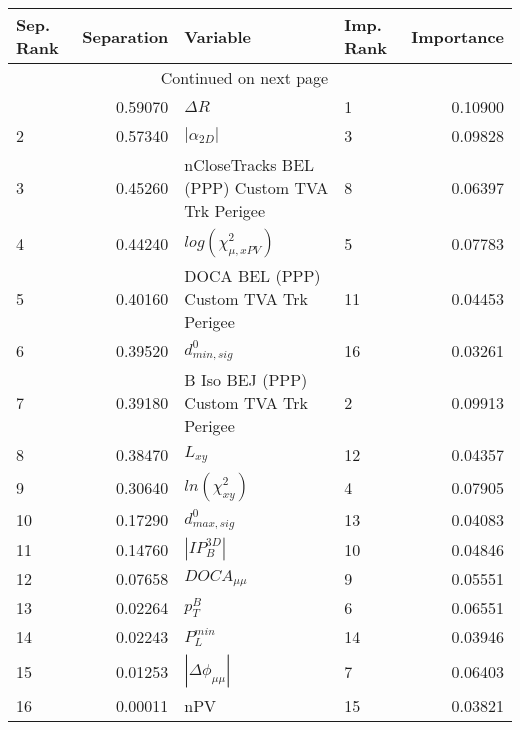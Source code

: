 \usepackage{lscape}

\begin{landscape}
\begin{longtable}{lrllr}
\toprule
Sep. Rank &  Separation &                                       Variable & Imp. Rank &  Importance \\
\midrule
\endhead
\midrule
\multicolumn{3}{r}{{Continued on next page}} \\
\midrule
\endfoot

\bottomrule
\endlastfoot
        1 &     0.59070 &                                     $\Delta R$ &         1 &     0.10900 \\
        2 &     0.57340 &                                $|\alpha_{2D}|$ &         3 &     0.09828 \\
        3 &     0.45260 &  nCloseTracks BEL (PPP) Custom TVA Trk Perigee &         8 &     0.06397 \\
        4 &     0.44240 &                      $log(\chi^{2}_{\mu,xPV})$ &         5 &     0.07783 \\
        5 &     0.40160 &          DOCA BEL (PPP) Custom TVA Trk Perigee &        11 &     0.04453 \\
        6 &     0.39520 &                               $d^0_{min, sig}$ &        16 &     0.03261 \\
        7 &     0.39180 &         B Iso BEJ (PPP) Custom TVA Trk Perigee &         2 &     0.09913 \\
        8 &     0.38470 &                                       $L_{xy}$ &        12 &     0.04357 \\
        9 &     0.30640 &                            $ln(\chi^{2}_{xy})$ &         4 &     0.07905 \\
       10 &     0.17290 &                               $d^0_{max, sig}$ &        13 &     0.04083 \\
       11 &     0.14760 &                                $|IP_{B}^{3D}|$ &        10 &     0.04846 \\
       12 &     0.07658 &                                $DOCA_{\mu\mu}$ &         9 &     0.05551 \\
       13 &     0.02264 &                                      $p^B_{T}$ &         6 &     0.06551 \\
       14 &     0.02243 &                                  $P^{min}_{L}$ &        14 &     0.03946 \\
       15 &     0.01253 &                       $|\Delta \phi_{\mu\mu}|$ &         7 &     0.06403 \\
       16 &     0.00011 &                                            nPV &        15 &     0.03821 \\
\end{longtable}

\end{landscape}
